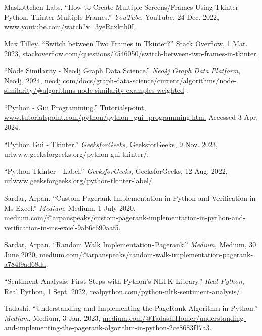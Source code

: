 \documentclass[fontsize=11pt]{article}
\begin{document}
\par Maskottchen Labs. “How to Create Multiple Screens/Frames Using Tkinter Python. Tkinter Multiple Frames.” \textit{YouTube}, YouTube, 24 Dec. 2022, \url{www.youtube.com/watch?v=3yeRcxkth0I}.

\par Max Tilley. “Switch between Two Frames in Tkinter?” Stack Overflow, 1 Mar. 2023, \url{stackoverflow.com/questions/7546050/switch-between-two-frames-in-tkinter}.

\par “Node Similarity - Neo4j Graph Data Science.” \textit{Neo4j Graph Data Platform}, Neo4j, 2024, \url{neo4j.com/docs/graph-data-science/current/algorithms/node-similarity/#algorithms-node-similarity-examples-weighted|}.

\par “Python - Gui Programming.” Tutorialspoint, \url{www.tutorialspoint.com/python/python_gui_programming.htm.} Accessed 3 Apr. 2024.

\par “Python Gui - Tkinter.” \textit{GeeksforGeeks}, GeeksforGeeks, 9 Nov. 2023, 
url{www.geeksforgeeks.org/python-gui-tkinter/}.

\par “Python Tkinter - Label.” \textit{GeeksforGeeks}, GeeksforGeeks, 12 Aug. 2022, 
url{www.geeksforgeeks.org/python-tkinter-label/}.

\par Sardar, Arpan. “Custom Pagerank Implementation in Python and Verification in Ms Excel.” \textit{Medium}, Medium, 1 July 2020, 
\\\url{medium.com/@arpanspeaks/custom-pagerank-implementation-in-python-and-verification-in-ms-excel-9ab6c690aaf5}.

\par Sardar, Arpan. “Random Walk Implementation - Pagerank.” \textit{Medium}, Medium, 30 June 2020,
\url{medium.com/@arpanspeaks/random-walk-implementation-pagerank-a784f9ad68da}.

\par “Sentiment Analysis: First Steps with Python’s NLTK Library.” \textit{Real Python}, Real Python, 1 Sept. 2022, \url{realpython.com/python-nltk-sentiment-analysis/.}

\par Tadashi. “Understanding and Implementing the PageRank Algorithm in Python.” \textit{Medium}, Medium, 3 Jan. 2023, \url{medium.com/@TadashiHomer/understanding-and-implementing-the-pagerank-algorithm-in-python-2ce8683f17a3}.
\end{document}
